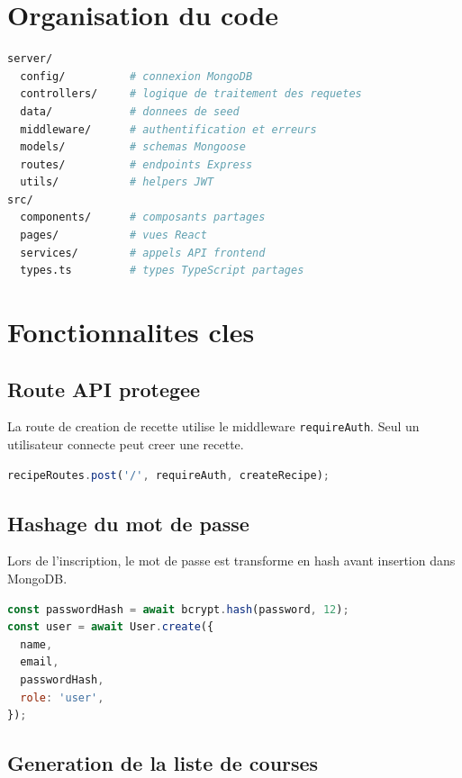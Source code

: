 \documentclass[12pt,a4paper]{report}
\begin{document}
\section{Organisation du code}

\begin{lstlisting}[language=bash,caption={Arborescence simplifiee du projet}]
server/
  config/          # connexion MongoDB
  controllers/     # logique de traitement des requetes
  data/            # donnees de seed
  middleware/      # authentification et erreurs
  models/          # schemas Mongoose
  routes/          # endpoints Express
  utils/           # helpers JWT
src/
  components/      # composants partages
  pages/           # vues React
  services/        # appels API frontend
  types.ts         # types TypeScript partages
\end{lstlisting}

\section{Fonctionnalites cles}

\subsection{Route API protegee}

La route de creation de recette utilise le middleware \texttt{requireAuth}. Seul un utilisateur connecte peut creer une recette.

\begin{lstlisting}[language=JavaScript,caption={Route protegee pour creer une recette}]
recipeRoutes.post('/', requireAuth, createRecipe);
\end{lstlisting}

\subsection{Hashage du mot de passe}

Lors de l'inscription, le mot de passe est transforme en hash avant insertion dans MongoDB.

\begin{lstlisting}[language=JavaScript,caption={Hashage bcrypt lors de l'inscription}]
const passwordHash = await bcrypt.hash(password, 12);
const user = await User.create({
  name,
  email,
  passwordHash,
  role: 'user',
});
\end{lstlisting}

\subsection{Generation de la liste de courses}
\end{document}
